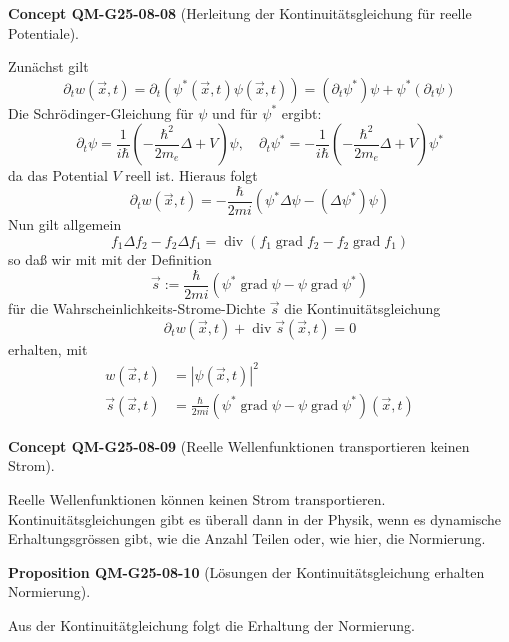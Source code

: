 \documentclass[10pt, letterpaper]{article}
\newcommand{\CustomHeading}[3]{%
  \par\medskip\noindent%
  \textbf{#1 #2} \textnormal{(#3)}.\enskip%
}
\newenvironment{PROP}[2]{\CustomHeading{Proposition}{#1}{#2}}{}
\newenvironment{CONC}[2]{\CustomHeading{Concept}{#1}{#2}}{}
\begin{document}
\begin{CONC}{QM-G25-08-08}{Herleitung der Kontinuitätsgleichung für reelle Potentiale}
Zunächst gilt
$$
\partial_{t} w(\vec{x}, t)=\partial_{t}\left(\psi^{*}(\vec{x}, t) \psi(\vec{x}, t)\right)=\left(\partial_{t} \psi^{*}\right) \psi+\psi^{*}\left(\partial_{t} \psi\right)
$$
Die Schrödinger-Gleichung für $\psi$ und für $\psi^{*}$ ergibt:
$$
\partial_{t} \psi=\frac{1}{i \hbar}\left(-\frac{\hbar^{2}}{2 m_{e}} \Delta+V\right) \psi, \quad \partial_{t} \psi^{*}=-\frac{1}{i \hbar}\left(-\frac{\hbar^{2}}{2 m_{e}} \Delta+V\right) \psi^{*}
$$
da das Potential $V$ reell ist. Hieraus folgt
$$
\partial_{t} w(\vec{x}, t)=-\frac{\hbar}{2 m i}\left(\psi^{*} \Delta \psi-\left(\Delta \psi^{*}\right) \psi\right)
$$
Nun gilt allgemein
$$
f_{1} \Delta f_{2}-f_{2} \Delta f_{1}=\operatorname{div}\left(f_{1} \operatorname{grad} f_{2}-f_{2} \operatorname{grad} f_{1}\right)
$$
so daß wir mit mit der Definition
$$
\vec{s}:=\frac{\hbar}{2 m i}\left(\psi^{*} \operatorname{grad} \psi-\psi \operatorname{grad} \psi^{*}\right)
$$
für die Wahrscheinlichkeits-Strome-Dichte $\vec{s}$ die Kontinuitätsgleichung
$$
\partial_{t} w(\vec{x}, t)+\operatorname{div} \vec{s}(\vec{x}, t)=0
$$
erhalten, mit
$$
\begin{aligned}
w(\vec{x}, t) & =|\psi(\vec{x}, t)|^{2} \\
\vec{s}(\vec{x}, t) & =\frac{\hbar}{2 m i}\left(\psi^{*} \operatorname{grad} \psi-\psi \operatorname{grad} \psi^{*}\right)(\vec{x}, t)
\end{aligned}
$$
\end{CONC}

\begin{CONC}{QM-G25-08-09}{Reelle Wellenfunktionen transportieren keinen Strom}
Reelle Wellenfunktionen können keinen Strom transportieren. Kontinuitätsgleichungen gibt es überall dann in der Physik, wenn es dynamische Erhaltungsgrössen gibt, wie die Anzahl Teilen oder, wie hier, die Normierung.
\end{CONC}

\begin{PROP}{QM-G25-08-10}{Lösungen der Kontinuitätsgleichung erhalten Normierung}
Aus der Kontinuitätgleichung folgt die Erhaltung der Normierung.
\end{PROP}
\end{document}

